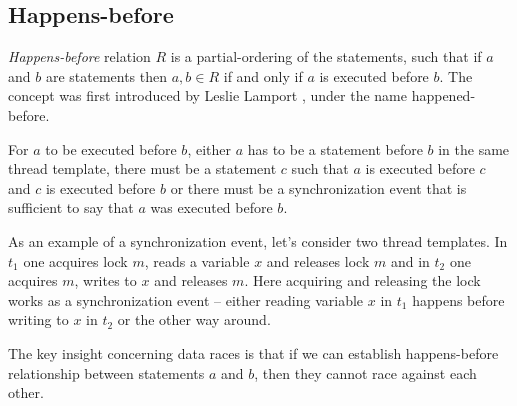 \documentclass[..thesis.tex]{subfiles}
\begin{document}
\subsection{Happens-before}

\textit{Happens-before} relation $R$ is a partial-ordering of the statements, such that if $a$ and $b$ are statements then  $a,b \in R$ if and only if $a$ is executed before $b$. The concept was first introduced by Leslie Lamport \cite{lamport_time_1978}, under the name happened-before.

For $a$ to be executed before $b$, either $a$ has to be a statement before $b$ in the same thread template, there must be a statement $c$ such that $a$ is executed before $c$ and $c$ is executed before $b$ or there must be a synchronization event that is sufficient to say that $a$ was executed before $b$.


As an example of a synchronization event, let's consider two thread templates. In $t_1$ one acquires lock $m$, reads a variable $x$ and releases lock $m$ and in $t_2$ one acquires $m$, writes to $x$ and releases $m$. Here acquiring and releasing the lock works as a synchronization event -- either reading variable $x$ in $t_1$ happens before writing to $x$ in $t_2$ or the other way around.

The key insight concerning data races is that if we can establish happens-before relationship between statements $a$ and $b$, then they cannot race against each other. 
\end{document}

